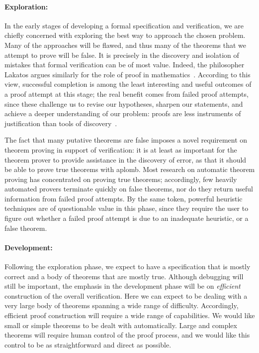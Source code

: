 \paragraph{Exploration:}
In the early stages of developing a formal
specification and verification, we are chiefly concerned with
exploring the best way to approach the chosen problem.  Many of the
approaches will be flawed, and thus many of the theorems that we
attempt to prove will be false.  It is precisely in the discovery and
isolation of mistakes that formal verification can be of most value.
Indeed, the philosopher Lakatos argues similarly for the role of proof
in mathematics~\cite{Lakatos}.  According to this view, successful
completion is among the least interesting and useful outcomes of a
proof attempt at this stage; the real benefit comes from failed proof
attempts, since these challenge us to revise our hypotheses, sharpen
our statements, and achieve a deeper understanding of our problem:
proofs are less instruments of justification than tools of
discovery~\cite{Kleiner91}.


The fact that many putative theorems are false imposes a novel
requirement on theorem proving in support of verification: it is at
least as important for the theorem prover to provide assistance in the
discovery of error, as that it should be able to prove true theorems
with aplomb.  Most research on automatic theorem proving has
concentrated on proving true theorems; accordingly, few heavily
automated provers terminate quickly on false theorems, nor do they return
useful information from failed proof attempts.  By the same token,
powerful heuristic techniques are of questionable value in this phase,
since they require the user to figure out whether a failed proof
attempt is due to an inadequate heuristic, or a false theorem.

\paragraph{Development:}
Following the exploration phase, we expect to have
a specification that is mostly correct and a body of theorems that are
mostly true.  Although debugging will still be important, the emphasis
in the development phase will be on {\em efficient\/} construction of
the overall verification.  Here we can expect to be dealing with a
very large body of theorems spanning a wide range of difficulty.
Accordingly, efficient proof construction will require a wide range of
capabilities.  We would like small or simple theorems to be dealt with
automatically.    Large and complex theorems will require human
control of the proof process, and we would like this control to be
as straightforward and direct as possible.

